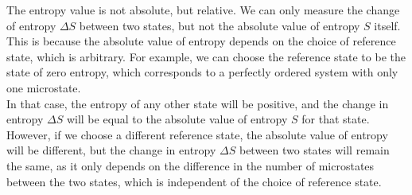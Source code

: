 \begin{remark}
    The entropy value is not absolute, but relative. We can only measure the change of entropy $\Delta S$ between two states, but not the absolute value of entropy $S$ itself. \\
    
    This is because the absolute value of entropy depends on the choice of reference state, which is arbitrary. For example, we can choose the reference state to be the state of zero entropy, which corresponds to a perfectly ordered system with only one microstate. \\

    In that case, the entropy of any other state will be positive, and the change in entropy $\Delta S$ will be equal to the absolute value of entropy $S$ for that state. However, if we choose a different reference state, the absolute value of entropy will be different, but the change in entropy $\Delta S$ between two states will remain the same, as it only depends on the difference in the number of microstates between the two states, which is independent of the choice of reference state.
\end{remark}

